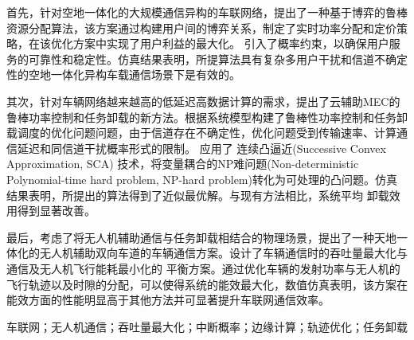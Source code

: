 首先，针对空地一体化的大规模通信异构的车联网络，提出了一种基于博弈的鲁棒资源分配算法，该方案通过构建用户间的博弈关系，制定了实时功率分配和定价策略，在该优化方案中实现了用户利益的最大化。
引入了概率约束，以确保用户服务的可靠性和稳定性。仿真结果表明，所提算法具有复杂多用户干扰和信道不确定性的空地一体化异构车载通信场景下是有效的。

其次，针对车辆网络越来越高的低延迟高数据计算的需求，提出了云辅助MEC的鲁棒功率控制和任务卸载的新方法。根据系统模型构建了鲁棒性功率控制和任务卸载调度的优化问题问题，由于信道存在不确定性，优化问题受到传输速率、计算通信延迟和同信道干扰概率形式的限制。
应用了 连续凸逼近(Successive Convex Approximation, SCA) 技术，将变量耦合的NP难问题(Non-deterministic Polynomial-time hard problem, NP-hard problem)转化为可处理的凸问题。仿真结果表明，所提出的算法得到了近似最优解。与现有方法相比，系统平均
卸载效用得到显著改善。

最后，考虑了将无人机辅助通信与任务卸载相结合的物理场景，提出了一种天地一体化的无人机辅助双向车道的车辆通信方案。设计了车辆通信时的吞吐量最大化与通信及无人机飞行能耗最小化的
平衡方案。通过优化车辆的发射功率与无人机的飞行轨迹以及时隙的分配，可以使得系统的能效最大化，数值仿真表明，该方案在能效方面的性能明显高于其他方法并可显著提升车联网通信效率。

\begin{keywords}
车联网；无人机通信；吞吐量最大化；中断概率；边缘计算；轨迹优化；任务卸载
\end{keywords}

\makeatletter
{}  \CAST@value@classification   %
\makeatother

\newpage\ \vspace{-2.5em}
\vspace{0.23cm}   %
\begin{center}
\makeatletter
{}\textbf{\CAST@value@entitle}    %
\makeatother
\end{center}

